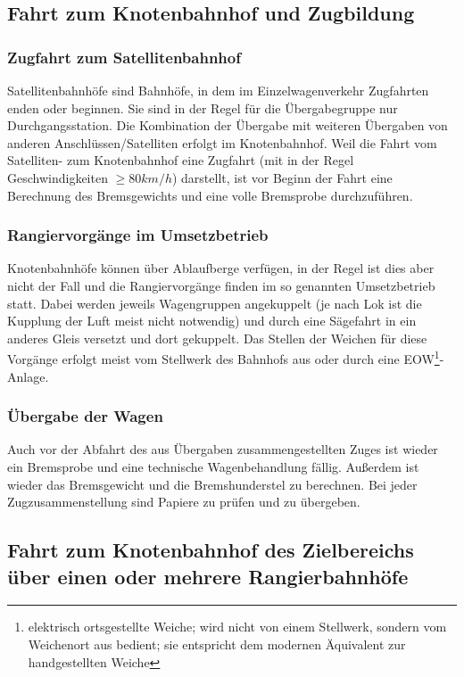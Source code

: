 \subsection{Fahrt zum Knotenbahnhof und Zugbildung}
\subsubsection{Zugfahrt zum Satellitenbahnhof}\label{sec:Zugfahrt}
Satellitenbahnhöfe sind Bahnhöfe, in dem im Einzelwagenverkehr Zugfahrten enden oder beginnen. Sie sind in der Regel für die Übergabegruppe nur Durchgangsstation. Die Kombination der Übergabe mit weiteren Übergaben von anderen Anschlüssen/Satelliten erfolgt im Knotenbahnhof. Weil die Fahrt vom Satelliten- zum Knotenbahnhof eine Zugfahrt (mit in der Regel Geschwindigkeiten $\ge 80 km/h$) darstellt, ist vor Beginn der Fahrt eine Berechnung des Bremsgewichts und eine volle Bremsprobe durchzuführen.%
\subsubsection{Rangiervorgänge im Umsetzbetrieb}\label{sec:Rangierfahrt}
Knotenbahnhöfe können über Ablaufberge verfügen, in der Regel ist dies aber nicht der Fall und die Rangiervorgänge finden im so genannten Umsetzbetrieb statt. Dabei werden jeweils Wagengruppen angekuppelt (je nach Lok ist die Kupplung der Luft meist nicht notwendig) und durch eine Sägefahrt in ein anderes Gleis versetzt und dort gekuppelt. Das Stellen der Weichen für diese Vorgänge erfolgt meist vom Stellwerk des Bahnhofs aus oder durch eine EOW\footnote{elektrisch ortsgestellte Weiche; wird nicht von einem Stellwerk, sondern vom Weichenort aus bedient; sie entspricht dem modernen Äquivalent zur handgestellten Weiche}-Anlage.
\subsubsection{Übergabe der Wagen}\label{sec:UEdWagen}
Auch vor der Abfahrt des aus Übergaben zusammengestellten Zuges ist wieder ein Bremsprobe und eine technische Wagenbehandlung fällig. Außerdem ist wieder das Bremsgewicht und die Bremshunderstel zu berechnen. Bei jeder Zugzusammenstellung sind Papiere zu prüfen und zu übergeben.

\subsection{Fahrt zum Knotenbahnhof des Zielbereichs über einen oder mehrere Rangierbahnhöfe}
